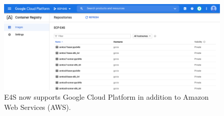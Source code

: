 \begin{figure}
	\centering
	\includegraphics[width=0.9\linewidth]{E4S-GCP}
	\caption{E4S now supports Google Cloud Platform in addition to Amazon Web Services (AWS).}
	\label{fig:e4s-gcp-image}
\end{figure}

